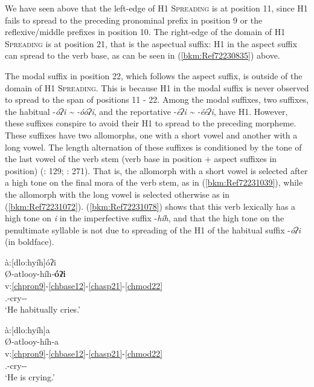 \documentclass[output=paper]{langscibook}
\begin{document}
We have seen above that the left-edge of H1 \textsc{Spreading} is at position 11, since H1 fails to spread to the preceding pronominal prefix in position 9 or the reflexive/middle prefixes in position 10. The right-edge of the domain of H1 \textsc{Spreading} is at position 21, that is the aspectual suffix: H1 in the aspect suffix can spread to the verb base, as can be seen in (\ref{bkm:Ref72230835}) above. 

The modal suffix in position 22, which follows the aspect suffix, is outside of the domain of H1 \textsc{Spreading}. This is because H1 in the modal suffix is never observed to spread to the span of positions 11 - 22. Among the modal suffixes, two suffixes, the habitual -\textit{óʔi {\textasciitilde} -óóʔi}, and the reportative -\textit{éʔi {\textasciitilde} -ééʔi}, have H1. However, these suffixes conspire to avoid their H1 to spread to the preceding morpheme. These suffixes have two allomorphs, one with a short vowel and another with a long vowel. The length alternation of these suffixes is conditioned by the tone of the last vowel of the verb stem (verb base in position  + aspect suffixes in position) (\citealt{Cook1979}: 129; \citealt{Montgomery-Anderson2008}: 271). That is, the allomorph with a short vowel is selected after a high tone on the final mora of the verb stem, as in (\ref{bkm:Ref72231039}), while the allomorph with the long vowel is selected otherwise as in (\ref{bkm:Ref72231072}). (\ref{bkm:Ref72231078}) shows that this verb lexically has a high tone on \textit{i} in the imperfective suffix -\textit{híh}, and that the high tone on the penultimate syllable is not due to spreading of the H1 of the habitual suffix -\textit{óʔi} (in boldface).

\ea\label{bkm:Ref72231039}à:[dlo:hyíh]óʔi  \\
\glll Ø-atlooy-híh-\textbf{óʔi}\\
v:\ref{chpron9}-\ref{chbase12}-\ref{chasp21}-\ref{chmod22} \\ 
\Third\Sg.\Aarg{}-cry-\Impf{}-\Hab{}\\
\glt `He habitually cries.' \citep[13]{Feeling1975}
\z 

\ea\label{bkm:Ref72231078}à:[dlo:hyíh]a \\
\glll Ø-atlooy-híh-a\\
v:\ref{chpron9}-\ref{chbase12}-\ref{chasp21}-\ref{chmod22} \\ 
\Third\Sg.\Aarg{}-cry-\Prs{}-\Ind{}\\
\glt `He is crying.' \citep[13]{Feeling1975}
\z 
\end{document}
